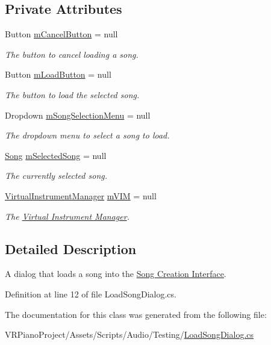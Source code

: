 \subsection*{Private Attributes}
\begin{DoxyCompactItemize}
\item 
Button \hyperlink{group___s_c___l_s_d_priv_var_ga80d9f1687c8636fa476961057a31453f}{m\+Cancel\+Button} = null
\begin{DoxyCompactList}\small\item\em The button to cancel loading a song. \end{DoxyCompactList}\item 
Button \hyperlink{group___s_c___l_s_d_priv_var_ga9957d4b958eff0baad80c6f787e0cb66}{m\+Load\+Button} = null
\begin{DoxyCompactList}\small\item\em The button to load the selected song. \end{DoxyCompactList}\item 
Dropdown \hyperlink{group___s_c___l_s_d_priv_var_ga8ac0ecbb68748b24638f916b02077a22}{m\+Song\+Selection\+Menu} = null
\begin{DoxyCompactList}\small\item\em The dropdown menu to select a song to load. \end{DoxyCompactList}\item 
\hyperlink{class_song}{Song} \hyperlink{group___s_c___l_s_d_priv_var_ga7c4bedd9eecf070d22bd344601379076}{m\+Selected\+Song} = null
\begin{DoxyCompactList}\small\item\em The currently selected song. \end{DoxyCompactList}\item 
\hyperlink{class_virtual_instrument_manager}{Virtual\+Instrument\+Manager} \hyperlink{group___s_c___l_s_d_priv_var_ga170dc79611647c9bff33b4d36dddaa6a}{m\+V\+IM} = null
\begin{DoxyCompactList}\small\item\em The \hyperlink{group___v_i_m}{Virtual Instrument Manager}. \end{DoxyCompactList}\end{DoxyCompactItemize}


\subsection{Detailed Description}
A dialog that loads a song into the \hyperlink{group___doc_s_c}{Song Creation Interface}. 

Definition at line 12 of file Load\+Song\+Dialog.\+cs.



The documentation for this class was generated from the following file\+:\begin{DoxyCompactItemize}
\item 
V\+R\+Piano\+Project/\+Assets/\+Scripts/\+Audio/\+Testing/\hyperlink{_load_song_dialog_8cs}{Load\+Song\+Dialog.\+cs}\end{DoxyCompactItemize}
